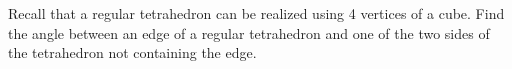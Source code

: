 Recall that a regular tetrahedron can be realized using 4 vertices of a cube. Find the angle between an edge of a regular tetrahedron and one of the two sides of the tetrahedron not containing the edge.


\begin{comment}Calculator code:
p0:=(1,1,1);
p1:=(-1,-1,1);
p2:=(1,-1,-1);
r:=(-1,1,-1)-(1,-1,-1);
n:= (p0-p1)\times (p0-p2);
\alpha:=((r n^t)_1)_1 /\sqrt{}(((n n^t)_1)_1)/  \sqrt{}(((r r^t)_1)_1); 
\arcsin (\alpha)
\end{comment}